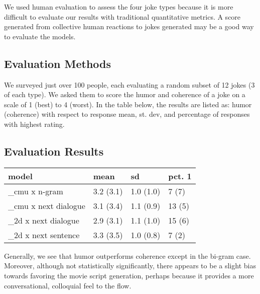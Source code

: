 \documentclass[twoside,twocolumn]{article}
\begin{document}
We used human evaluation to assess the four joke types because it is more difficult to evaluate our results with traditional quantitative metrics. A score generated from collective human reactions to jokes generated may be a good way to evaluate the models.

\subsection{Evaluation Methods}

We surveyed just over 100 people, each evaluating a random subset of 12 jokes (3 of each type). We asked them to score the humor and coherence of a joke on a scale of 1 (best) to 4 (worst). In the table below, the results are listed as: humor (coherence) with respect to response mean, st. dev, and percentage of responses with highest rating.

\subsection{Evaluation Results}

\begin{center}
    \begin{tabular}{ p{2.0cm} | p{1.2cm}| p{1.2cm} | p{0.9cm} }
    model & mean & sd & pct. 1 \\
    \hline
    \_cmu x n-gram & 3.2 (3.1) & 1.0 (1.0) & 7 (7) \\ 
    \hline
    \_cmu x next dialogue & 3.1 (3.4) & 1.1 (0.9) & 13 (5) \\ 
    \hline
    \_2d x next dialogue & 2.9 (3.1) & 1.1 (1.0) & 15 (6) \\ 
    \hline
    \_2d x next sentence & 3.3 (3.5) & 1.0 (0.8) & 7 (2) \\ 
    \end{tabular}
\end{center}
    
Generally, we see that humor outperforms coherence except in the bi-gram case. Moreover, although not statistically significantly, there appears to be a slight bias towards favoring the movie script generation, perhaps because it provides a more conversational, colloquial feel to the flow.


\end{document}
